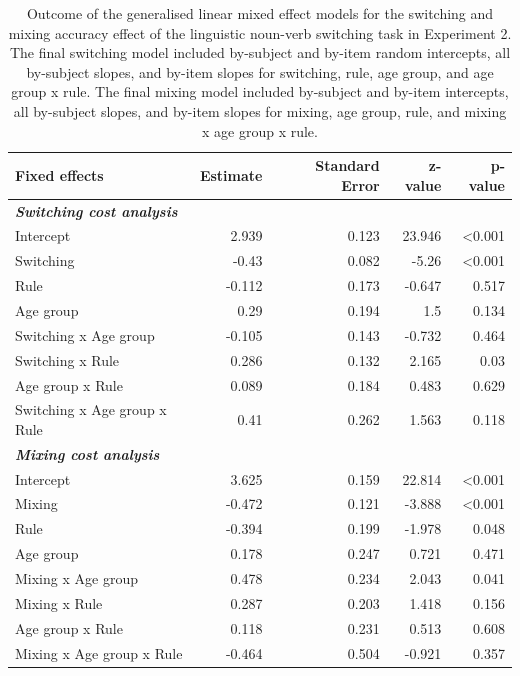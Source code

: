 \documentclass[
]{article}
\begin{document}
\begin{table}

\caption{\label{tab:TableS10}Outcome of the generalised linear mixed effect models for the switching and mixing accuracy effect of the linguistic noun-verb switching task in Experiment 2. The final switching model included by-subject and by-item random intercepts, all by-subject slopes, and by-item slopes for switching, rule, age group, and age group x rule. The final mixing model included by-subject and by-item intercepts, all by-subject slopes, and by-item slopes for mixing, age group, rule, and mixing x age group x rule.}
\centering
\begin{tabular}[t]{lrrrr}
\toprule
\textbf{Fixed effects} & \textbf{Estimate} & \textbf{Standard Error} & \textbf{z-value} & \textbf{p-value}\\
\midrule
\em{\textbf{Switching cost analysis}} & \em{\textbf{}} & \em{\textbf{}} & \em{\textbf{}} & \em{\textbf{}}\\
Intercept & 2.939 & 0.123 & 23.946 & <0.001\\
Switching & -0.43 & 0.082 & -5.26 & <0.001\\
Rule & -0.112 & 0.173 & -0.647 & 0.517\\
Age group & 0.29 & 0.194 & 1.5 & 0.134\\
\addlinespace
Switching x Age group & -0.105 & 0.143 & -0.732 & 0.464\\
Switching x Rule & 0.286 & 0.132 & 2.165 & 0.03\\
Age group x Rule & 0.089 & 0.184 & 0.483 & 0.629\\
Switching x Age group x Rule & 0.41 & 0.262 & 1.563 & 0.118\\
\em{\textbf{Mixing cost analysis}} & \em{\textbf{}} & \em{\textbf{}} & \em{\textbf{}} & \em{\textbf{}}\\
\addlinespace
Intercept & 3.625 & 0.159 & 22.814 & <0.001\\
Mixing & -0.472 & 0.121 & -3.888 & <0.001\\
Rule & -0.394 & 0.199 & -1.978 & 0.048\\
Age group & 0.178 & 0.247 & 0.721 & 0.471\\
Mixing x Age group & 0.478 & 0.234 & 2.043 & 0.041\\
\addlinespace
Mixing x Rule & 0.287 & 0.203 & 1.418 & 0.156\\
Age group x Rule & 0.118 & 0.231 & 0.513 & 0.608\\
Mixing x Age group x Rule & -0.464 & 0.504 & -0.921 & 0.357\\
\bottomrule
\end{tabular}
\end{table}
\end{document}
